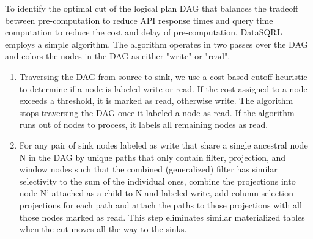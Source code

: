 \documentclass[	DIV=calc,%
							paper=letter,%
							fontsize=11pt,%
							twocolumn]{scrartcl}	 					%
\begin{document}
To identify the optimal cut of the logical plan DAG that balances the tradeoff between pre-computation to reduce API response times and query time computation to reduce the cost and delay of pre-computation, DataSQRL employs a simple algorithm.
The algorithm operates in two passes over the DAG and colors the nodes in the DAG as either "write" or "read".
\begin{enumerate}
    \item Traversing the DAG from source to sink, we use a cost-based cutoff heuristic to determine if a node is labeled write or read. If the cost assigned to a node exceeds a threshold, it is marked as read, otherwise write. The algorithm stops traversing the DAG once it labeled a node as read. If the algorithm runs out of nodes to process, it labels all remaining nodes as read.
    \item For any pair of sink nodes labeled as write that share a single ancestral node N in the DAG by unique paths that only contain filter, projection, and window nodes such that the combined (generalized) filter has similar selectivity to the sum of the individual ones, combine the projections into node N' attached as a child to N and labeled write, add column-selection projections for each path and attach the paths to those projections with all those nodes marked as read. This step eliminates similar materialized tables when the cut moves all the way to the sinks.
\end{enumerate}
\end{document}
